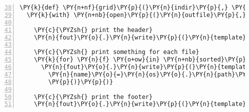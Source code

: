 \begin{Verbatim}[commandchars=\\\{\},numbers=left,numbersep=0.5em,firstnumber=38]
\PY{k}{def} \PY{n+nf}{grid}\PY{p}{(}\PY{n}{indir}\PY{p}{,} \PY{n}{outfile}\PY{p}{,} \PY{n}{C}\PY{o}{=}\PY{l+m+mi}{5}\PY{p}{,} \PY{n}{N}\PY{o}{=}\PY{n+nb+bp}{None}\PY{p}{)}\PY{p}{:}
  \PY{k}{with} \PY{n+nb}{open}\PY{p}{(}\PY{n}{outfile}\PY{p}{,} \PY{l+s}{\PYZdq{}}\PY{l+s}{w}\PY{l+s}{\PYZdq{}}\PY{p}{)} \PY{k}{as} \PY{n}{fout}\PY{p}{:}
    
    \PY{c}{\PYZsh{} print the header}
    \PY{n}{fout}\PY{o}{.}\PY{n}{write}\PY{p}{(}\PY{n}{template}\PY{p}{(}\PY{n}{header}\PY{p}{)}\PY{o}{.}\PY{n}{format}\PY{p}{(}\PY{n}{cols}\PY{o}{=}\PY{n}{C}\PY{p}{)}\PY{p}{)}
    
    \PY{c}{\PYZsh{} print something for each file}
    \PY{k}{for} \PY{n}{f} \PY{o+ow}{in} \PY{n+nb}{sorted}\PY{p}{(}\PY{n}{os}\PY{o}{.}\PY{n}{listdir}\PY{p}{(}\PY{n}{indir}\PY{p}{)}\PY{p}{)}\PY{p}{[}\PY{p}{:}\PY{n}{N}\PY{p}{]}\PY{p}{:}
      \PY{n}{fout}\PY{o}{.}\PY{n}{write}\PY{p}{(}\PY{n}{template}\PY{p}{(}\PY{n}{texstring}\PY{p}{)}\PY{o}{.}\PY{n}{format}\PY{p}{(}
        \PY{n}{name}\PY{o}{=}\PY{n}{os}\PY{o}{.}\PY{n}{path}\PY{o}{.}\PY{n}{join}\PY{p}{(}\PY{n}{indir}\PY{p}{,}\PY{n}{f}\PY{p}{)}\PY{p}{,}
        \PY{p}{)}\PY{p}{)}
      
    \PY{c}{\PYZsh{} print the footer}
    \PY{n}{fout}\PY{o}{.}\PY{n}{write}\PY{p}{(}\PY{n}{template}\PY{p}{(}\PY{n}{footer}\PY{p}{)}\PY{o}{.}\PY{n}{format}\PY{p}{(}\PY{p}{)}\PY{p}{)}
\end{Verbatim}

